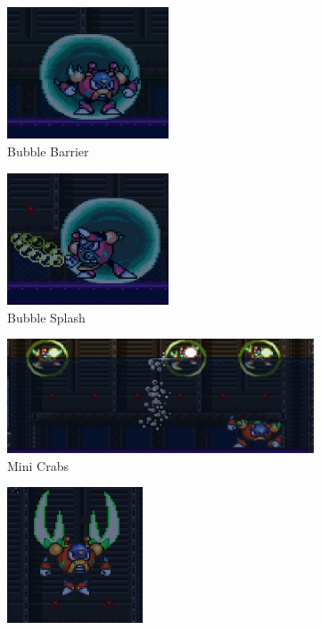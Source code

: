 \begin{figure}[htp]
	\centering
	\begin{subfigure}{0.40\linewidth}
		\centering
		\includegraphics[height=3.9cm]{figures/X2/Bubble_crab/Crab_bubble.png}
		\caption{Bubble Barrier}
	\end{subfigure}
	\begin{subfigure}{0.40\linewidth}
		\centering
		\includegraphics[height=3.9cm]{figures/X2/Bubble_crab/Crab_splasher.png}
		\caption{Bubble Splash}
	\end{subfigure}
	\begin{subfigure}{\linewidth}
		\centering
		\includegraphics[width=\linewidth]{figures/X2/Bubble_crab/Crab_minicrab.png}
		\caption{Mini Crabs}
	\end{subfigure}
	\begin{subfigure}{0.40\linewidth}
		\centering
		\includegraphics[height=4cm]{figures/X2/Bubble_crab/Crab_pinch.png}

\end{subfigure}
\end{figure}
